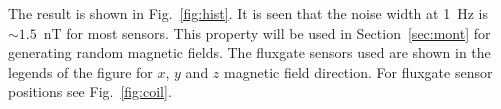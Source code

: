 The result is shown in Fig.~\ref{fig:hist}. It is seen that the noise width at 1~Hz is $\sim1.5$~nT for most sensors. This property will be used in Section~\ref{sec:mont} for generating random magnetic fields. The fluxgate sensors used are shown in the legends of the figure for $x$, $y$ and $z$ magnetic field direction. For fluxgate sensor positions see Fig.~\ref{fig:coil}.





